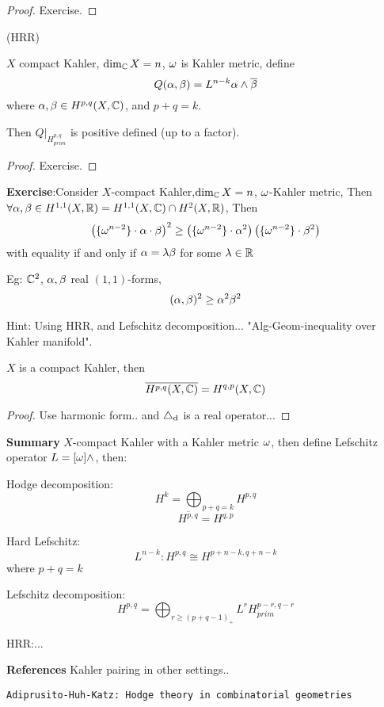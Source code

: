 \begin{proof}
Exercise.
\end{proof}

\begin{thm}(HRR)

$X$ compact Kahler, $\dim_{\mathbb{C}} X=n$, $\omega$ is Kahler metric, define
$$Q(\alpha,\beta)=L^{n-k}\alpha\wedge\overline{\beta}$$
where $\alpha,\beta\in H^{p,q}(X,\mathbb{C})$, and $p+q=k$.

Then $Q|_{H_{prim}^{p,q}}$ is positive defined (up to a factor).
\end{thm}

\begin{proof}
Exercise.
\end{proof}

\textbf{Exercise}:Consider $X$-compact Kahler,$\dim_{\mathbb{C}} X=n$, $\omega$-Kahler metric,
Then $\forall\alpha,\beta\in H^{1,1}(X,\mathbb{R})=H^{1,1}(X,\mathbb{C})\cap H^2(X,\mathbb{R})$,
Then
$$
  \left(
    \{\omega^{n-2}\}\cdot\alpha\cdot\beta
  \right)^2
\geq
  \left(
    \{\omega^{n-2}\}\cdot\alpha^2
  \right)
  \left(
    \{\omega^{n-2}\}\cdot\beta^2
  \right)
$$
with equality if and only if $\alpha=\lambda\beta$ for some $\lambda\in \mathbb{R}$

Eg: $\mathbb{C}^2$, $\alpha,\beta$ real $(1,1)$-forms,
$$(\alpha,\beta)^2\geq \alpha^2\beta^2$$

Hint: Using HRR, and Lefschitz decomposition...
"Alg-Geom-inequality over Kahler manifold".

\begin{prop}
$X$ is a compact Kahler, then
$$\overline{H^{p,q}(X,\mathbb{C})}=H^{q,p}(X,\mathbb{C})$$
\end{prop}
\begin{proof}
Use harmonic form.. and $\triangle_{\mathrm{d}}$ is a real operator...
\end{proof}

\textbf{Summary} $X$-compact Kahler with a Kahler metric $\omega$, then
define Lefschitz operator $L=[\omega]\wedge$, then:

Hodge decomposition:
$$H^k=\bigoplus_{p+q=k}H^{p,q}$$
$$\overline{H^{p,q}}=H^{q,p}$$

Hard Lefschitz:
$$L^{n-k}:H^{p,q}\cong H^{p+n-k,q+n-k}$$
where $p+q=k$

Lefschitz decomposition:
$$H^{p,q}=\bigoplus_{r\geq(p+q-1)_+} L^r H^{p-r,q-r}_{prim}$$

HRR:...

\textbf{References}
Kahler pairing in other settings..

\verb"Adiprusito-Huh-Katz: Hodge theory in combinatorial geometries"

